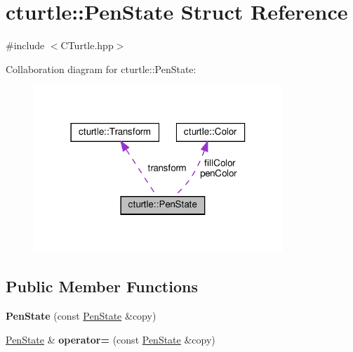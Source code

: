 \hypertarget{structcturtle_1_1PenState}{}\section{cturtle\+:\+:Pen\+State Struct Reference}
\label{structcturtle_1_1PenState}


{\ttfamily \#include $<$C\+Turtle.\+hpp$>$}



Collaboration diagram for cturtle\+:\+:Pen\+State\+:
\nopagebreak
\begin{figure}[H]
\begin{center}
\leavevmode
\includegraphics[width=266pt]{structcturtle_1_1PenState__coll__graph}
\end{center}
\end{figure}
\subsection*{Public Member Functions}
\begin{DoxyCompactItemize}
\item 
\mbox{\label{structcturtle_1_1PenState_a308973ed85eee69acd4f98b72e2be21c}} 
{\bfseries Pen\+State} (const \hyperlink{structcturtle_1_1PenState}{Pen\+State} \&copy)
\item 
\mbox{\label{structcturtle_1_1PenState_aa324f2f3a6cc360d8d927e677c6b6d1a}} 
\hyperlink{structcturtle_1_1PenState}{Pen\+State} \& {\bfseries operator=} (const \hyperlink{structcturtle_1_1PenState}{Pen\+State} \&copy)
\end{DoxyCompactItemize}
